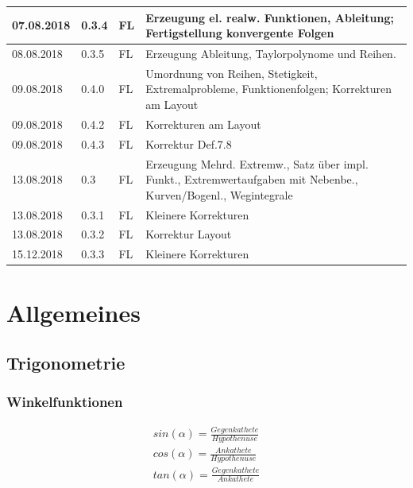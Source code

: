 \documentclass[12pt,a4paper]{report}%
\numberwithin{equation}{section}
\numberwithin{equation}{subsection}
\begin{document}
\begin{tabular}{|p{2cm}|p{1cm}|p{1.5cm}|p{8.5cm}|}
    07.08.2018 & 0.3.4 & FL & Erzeugung el. realw. Funktionen, Ableitung; Fertigstellung konvergente Folgen \\ \hline
    08.08.2018 & 0.3.5 & FL & Erzeugung Ableitung, Taylorpolynome und Reihen. \\ \hline
    09.08.2018 & 0.4.0 & FL & Umordnung von Reihen, Stetigkeit, Extremalprobleme, Funktionenfolgen; Korrekturen am Layout \\ \hline
    09.08.2018 & 0.4.2 & FL & Korrekturen am Layout \\ \hline
    09.08.2018 & 0.4.3 & FL & Korrektur Def.7.8 \\ \hline
    13.08.2018 & 0.3 & FL & Erzeugung Mehrd. Extremw., Satz über impl. Funkt., Extremwertaufgaben mit Nebenbe., Kurven/Bogenl., Wegintegrale \\ \hline
    13.08.2018 & 0.3.1 & FL & Kleinere Korrekturen \\ \hline
    13.08.2018 & 0.3.2 & FL & Korrektur Layout \\ \hline
   15.12.2018 & 0.3.3 & FL & Kleinere Korrekturen \\ \hline
  \end{tabular}
  
\newpage
\listoffigures

\newpage
\chapter{Allgemeines}
	\section{Trigonometrie}
	  \subsection{Winkelfunktionen}
	  \begin{align}
	    sin(\alpha) = \frac{Gegenkathete}{Hypothenuse}\\
	    cos(\alpha) = \frac{Ankathete}{Hypothenuse}\\
	    tan(\alpha) = \frac{Gegenkathete}{Ankathete} \label{eq:trigo_Winkelf}
	  \end{align}
	  
\end{document}
